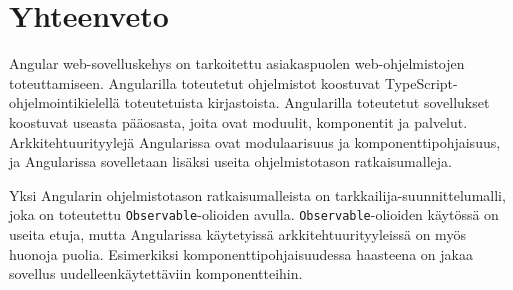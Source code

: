 \documentclass[finnish]{tktltiki2}
\theoremstyle{definition}
\theoremstyle{remark}
\numberwithin{figure}{section}
\begin{document}
\newpage


\section{Yhteenveto}

Angular web-sovelluskehys on tarkoitettu asiakaspuolen web-ohjelmistojen toteuttamiseen. Angularilla toteutetut ohjelmistot koostuvat TypeScript-ohjelmointikielellä toteutetuista kirjastoista. Angularilla toteutetut sovellukset koostuvat useasta pääosasta, joita ovat moduulit, komponentit ja palvelut. Arkkitehtuurityylejä Angularissa ovat modulaarisuus ja komponenttipohjaisuus, ja Angularissa sovelletaan lisäksi useita ohjelmistotason ratkaisumalleja.

Yksi Angularin ohjelmistotason ratkaisumalleista on tarkkailija-suunnittelumalli, joka on toteutettu \texttt{Observable}-olioiden avulla. \texttt{Observable}-olioiden käytössä on useita etuja, mutta Angularissa käytetyissä arkkitehtuurityyleissä on myös huonoja puolia. Esimerkiksi komponenttipohjaisuudessa haasteena on jakaa sovellus uudelleenkäytettäviin komponentteihin. 





%
%
% 
%


%
\newpage

\renewcommand{\BRetrieved}[1]{Tarkistettu {#1}, saatavilla\ }
\renewcommand{\BRetrievedFrom}{Tarkistettu saatavilla\ }




% 
\end{document}
